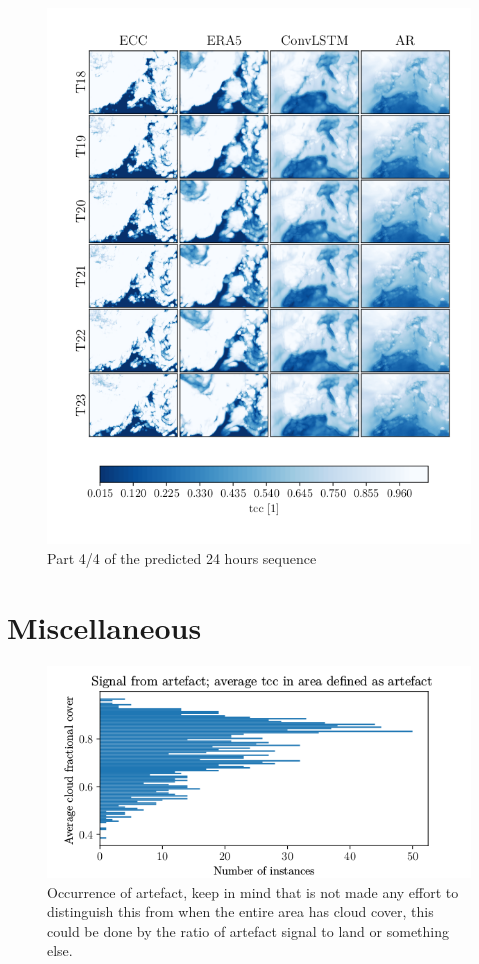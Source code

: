 \begin{figure}
    \centering
    \includegraphics{python_figs/comparting_seq_part_4_of4.png}
    \caption{Part 4/4 of the predicted 24 hours sequence }
    \label{fig:part4/4}
\end{figure}

\cleardoublepage

\chapter{Miscellaneous} \label{app:misc}

\begin{figure}
    \centering
    \includegraphics{python_figs/signal_artefact.png}
    \caption{Occurrence of artefact, keep in mind that is not made any effort to distinguish this from when the entire area has cloud cover, this could be done by the ratio of artefact signal to land or something else. }
    \label{fig:signal_artefact}
\end{figure}

